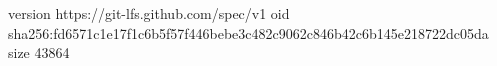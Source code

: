 version https://git-lfs.github.com/spec/v1
oid sha256:fd6571c1e17f1c6b5f57f446bebe3c482c9062c846b42c6b145e218722dc05da
size 43864
